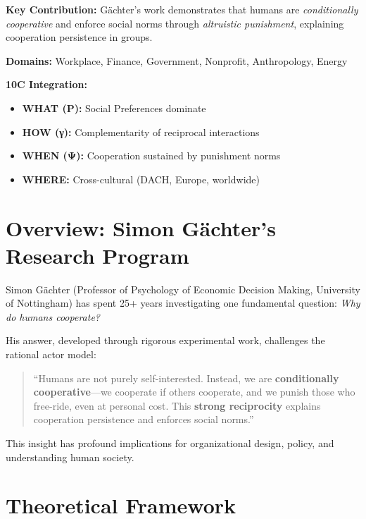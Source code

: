 \documentclass[11pt]{article}
\begin{document}
\textbf{Key Contribution:} Gächter's work demonstrates that humans are
\textit{conditionally cooperative} and enforce social norms through
\textit{altruistic punishment}, explaining cooperation persistence in groups.

\textbf{Domains:} Workplace, Finance, Government, Nonprofit, Anthropology, Energy

\textbf{10C Integration:}
\begin{itemize}
    \item \textbf{WHAT (P):} Social Preferences dominate
    \item \textbf{HOW (γ):} Complementarity of reciprocal interactions
    \item \textbf{WHEN (Ψ):} Cooperation sustained by punishment norms
    \item \textbf{WHERE:} Cross-cultural (DACH, Europe, worldwide)
\end{itemize}

\section*{Overview: Simon Gächter's Research Program}

Simon Gächter (Professor of Psychology of Economic Decision Making, University of
Nottingham) has spent 25+ years investigating one fundamental question:
\textit{Why do humans cooperate?}

His answer, developed through rigorous experimental work, challenges the rational
actor model:

\begin{quote}
``Humans are not purely self-interested. Instead, we are \textbf{conditionally
cooperative}—we cooperate if others cooperate, and we punish those who free-ride,
even at personal cost. This \textbf{strong reciprocity} explains cooperation
persistence and enforces social norms.''
\end{quote}

This insight has profound implications for organizational design, policy, and
understanding human society.


\section{Theoretical Framework}
\label{sec:theory}
\end{document}
